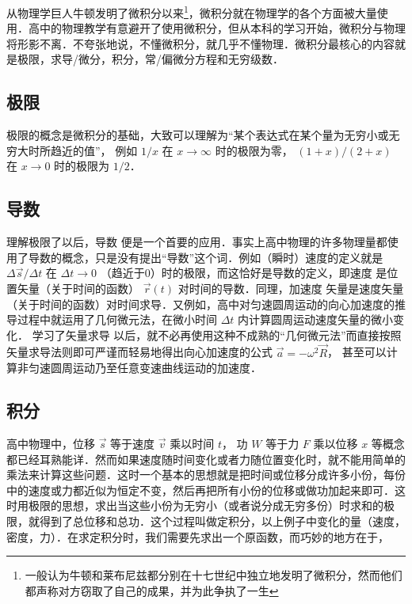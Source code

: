 
从物理学巨人牛顿发明了微积分以来\footnote{一般认为牛顿和莱布尼兹都分别在十七世纪中独立地发明了微积分，然而他们都声称对方窃取了自己的成果，并为此争执了一生}，微积分就在物理学的各个方面被大量使用．高中的物理教学有意避开了使用微积分，但从本科的学习开始，微积分与物理将形影不离．不夸张地说，不懂微积分，就几乎不懂物理．微积分最核心的内容就是极限，求导/微分，积分，常/偏微分方程和无穷级数．

\subsection{极限}
极限的概念是微积分的基础，大致可以理解为“某个表达式在某个量为无穷小或无穷大时所趋近的值”， 例如 $1/x$ 在 $x\to\infty$ 时的极限为零， $(1+x)/(2+x)$ 在 $x\to 0$ 时的极限为 $1/2$． 

\subsection{导数}
理解极限了以后，导数 便是一个首要的应用．事实上高中物理的许多物理量都使用了导数的概念，只是没有提出“导数”这个词．例如（瞬时）速度的定义就是 $\Delta\vec s/\Delta t$ 在 $\Delta t \to 0$ （趋近于0）时的极限，而这恰好是导数的定义，即速度%
是位置矢量（关于时间的函数） $\vec r(t)$ 对时间的导数．同理，加速度%
矢量是速度矢量（关于时间的函数）对时间求导．又例如，高中对匀速圆周运动的向心加速度的推导过程中就运用了几何微元法，在微小时间 $\Delta t$ 内计算圆周运动速度矢量的微小变化． 学习了矢量求导 以后，就不必再使用这种不成熟的“几何微元法”而直接按照矢量求导法则即可严谨而轻易地得出向心加速度的公式 $\vec a = -\omega^2 \vec R$， 甚至可以计算非匀速圆周运动乃至任意变速曲线运动的加速度．

\subsection{积分}
高中物理中，位移 $\vec s$ 等于速度 $\vec v$ 乘以时间 $t$， 功 $W$ 等于力 $F$ 乘以位移 $x$ 等概念都已经耳熟能详．然而如果速度随时间变化或者力随位置变化时，就不能用简单的乘法来计算这些问题．这时一个基本的思想就是把时间或位移分成许多小份，每份中的速度或力都近似为恒定不变，然后再把所有小份的位移或做功加起来即可．这时用极限的思想，求出当这些小份为无穷小（或者说分成无穷多份）时求和的极限，就得到了总位移和总功．这个过程叫做定积分，以上例子中变化的量（速度，密度，力）．在求定积分时，我们需要先求出一个原函数，而巧妙的地方在于，

